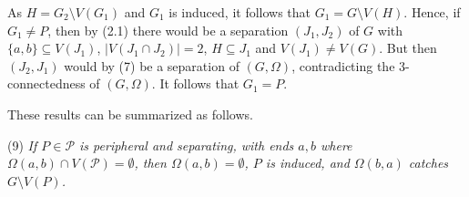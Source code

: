 As $H = G_2 \setminus V(G_1)$ and $G_1$ is induced, it follows that $G_1 = G \setminus V(H)$. Hence, if $G_1 \ne P$, then by (2.1) there would be a separation $(J_1, J_2)$ of $G$ with $\{a, b\} \subseteq V(J_1)$, $|V(J_1 \cap J_2)| = 2$, $H \subseteq J_1$ and $V(J_1) \ne V(G)$. But then $(J_2, J_1)$ would by (7) be a separation of $(G, \Omega)$, contradicting the 3-connectedness of $(G, \Omega)$. It follows that $G_1 = P$.

These results can be summarized as follows.

\hspace*{12pt}(9) \textit{If $P \in \mathcal{P}$ is peripheral and separating, with ends $a, b$ where $\Omega(a, b) \cap V(\mathcal{P}) = \emptyset$, then $\Omega(a, b) = \emptyset$, $P$ is induced, and $\Omega(b, a)$ catches $G \setminus V(P)$.}
